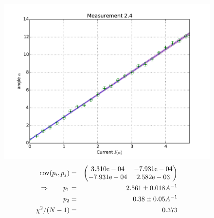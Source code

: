\begin{figure}
    \begin{centering}
        \includegraphics[width=18cm]{figures/fig24}
\captionsetup{singlelinecheck=off} 
\caption[.]{
\begin{eqnarray*}
    \mathrm{cov}(p_i, p_j) &=& 
    \begin{pmatrix}
        3.310\mathrm{e}-04 &-7.931\mathrm{e}-04 \\
        -7.931\mathrm{e}-04 &2.582\mathrm{e}-03 \\
    \end{pmatrix}
\\ \Rightarrow \qquad
    p_1 &=& 2.561 \pm 0.018 A^{-1}\\
    p_2 &=& 0.38 \pm 0.05 A^{-1} \\
    \chi ^2/(N-1) &=&  0.373
\end{eqnarray*}
}
    \end{centering}
\end{figure}

